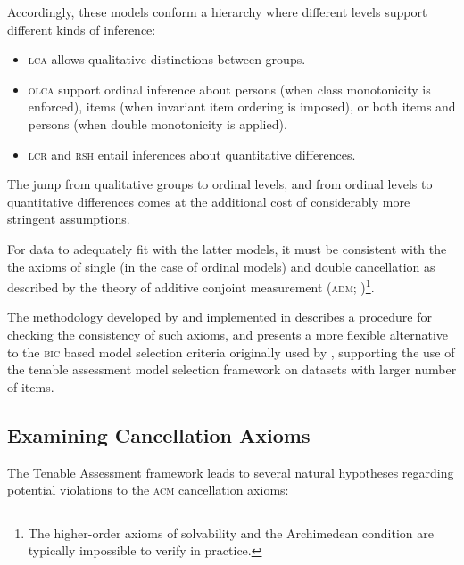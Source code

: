 \documentclass[12pt]{article}
\begin{document}
Accordingly, these models conform a hierarchy where different levels support different kinds of inference:

\begin{itemize}
	\item \textsc{lca} allows qualitative distinctions between groups.
	\item \textsc{olca} support ordinal inference about persons (when class monotonicity is enforced), items (when invariant item ordering is imposed), or both items and persons (when double monotonicity is applied).
	\item \textsc{lcr} and \textsc{rsh} entail inferences about quantitative differences.
\end{itemize}

The jump from qualitative groups to ordinal levels, and from ordinal levels to quantitative differences comes at the additional cost of considerably more stringent assumptions. 


For data to adequately fit with the latter models, it must be consistent with the the axioms of single (in the case of ordinal models) and double cancellation as described by the theory of additive conjoint measurement (\textsc{adm}; )\footnote{The higher-order axioms of solvability and the Archimedean condition are typically impossible to verify in practice.}.

The methodology developed by  and implemented in  describes a procedure for checking the consistency of such axioms, and presents a more flexible alternative to the \textsc{bic} based model selection criteria originally used by , supporting the use of the tenable assessment model selection framework on datasets with larger number of items.

\subsection{Examining Cancellation Axioms}

The Tenable Assessment framework  leads to several natural hypotheses regarding potential violations to the \textsc{acm} cancellation axioms:
\end{document}
